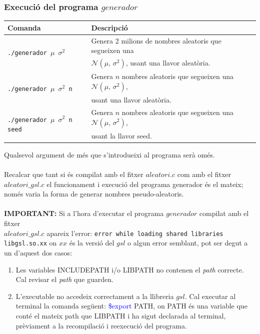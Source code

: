 \documentclass[a4paper, 11pt]{article}
\begin{document}
\subsubsection{Execució del programa $generador$}\label{exe_gen}
\begin{table}[h]
    \centering
    \begin{tabular}{l|l}
        \textbf{Comanda} & \textbf{Descripció} \\ \hline \hline 
        \multirow{2}{*}{\texttt{./generador $\mu$ $\sigma^2$ }} & Genera 2 milions de nombres aleatoris que segueixen una  \\
        & $\mathcal{N}(\mu,\,\sigma^{2})$, usant una llavor aleatòria. \\\hline
        \multirow{2}{*}{\texttt{./generador $\mu$ $\sigma^2$ n }} & Genera $n$ nombres aleatoris que segueixen una $\mathcal{N}(\mu,\,\sigma^{2})$,\\
        & usant una llavor aleatòria.\\\hline
        \multirow{2}{*}{\texttt{./generador $\mu$ $\sigma^2$ n seed}}  & Genera $n$ nombres aleatoris que segueixen una $\mathcal{N}(\mu,\,\sigma^{2})$, \\
        &usant la llavor seed. \\
        
    \end{tabular}
    \label{tab:my_label}
\end{table}
\hspace{-1.5em}Qualsevol argument de més que s'introdueixi al programa serà omés.\\\\
Recalcar que tant si és compilat amb el fitxer $aleatori.c$ com amb el fitxer $aleatori\_gsl.c$ el funcionament i execució del programa generador és el mateix; només varia la forma de generar nombres pseudo-aleatoris.\\\\
\textbf{IMPORTANT:} Si a l'hora d'executar el programa $generador$ compilat amb el fitxer 
\\$aleatori\_gsl.c$ apareix l'error: \texttt{error while loading shared libraries libgsl.so.xx} on $xx$ és la versió del $gsl$ o algun error semblant, pot ser degut a un d'aquest dos casos:
\begin{enumerate}
    \item Les variables \textcolor{amaranth}{INCLUDEPATH} i/o \textcolor{amaranth}{LIBPATH} no contenen el \textit{path} correcte. Cal revisar el \textit{path} que guarden.
    \item L'executable no accedeix correctament a la llibreria $gsl$. Cal executar al terminal la comanda següent: \textcolor{blue}{\$export} PATH, on PATH és una variable que conté el mateix path que \textcolor{amaranth}{LIBPATH} i ha sigut declarada al terminal, prèviament a la recompilació i reexecució del programa.
\end{enumerate}
\newpage
\end{document}
